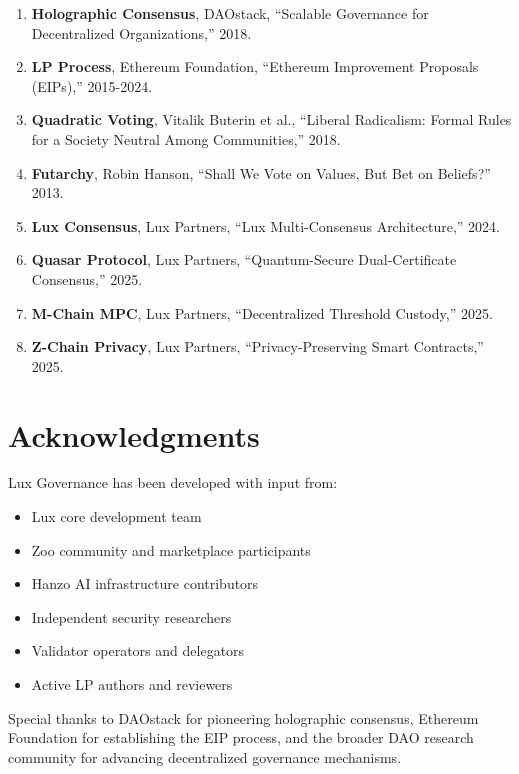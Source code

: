 \documentclass[11pt,a4paper]{article}
\begin{document}
\begin{enumerate}
\item \textbf{Holographic Consensus}, DAOstack, ``Scalable Governance for Decentralized Organizations,'' 2018.

\item \textbf{LP Process}, Ethereum Foundation, ``Ethereum Improvement Proposals (EIPs),'' 2015-2024.

\item \textbf{Quadratic Voting}, Vitalik Buterin et al., ``Liberal Radicalism: Formal Rules for a Society Neutral Among Communities,'' 2018.

\item \textbf{Futarchy}, Robin Hanson, ``Shall We Vote on Values, But Bet on Beliefs?'' 2013.

\item \textbf{Lux Consensus}, Lux Partners, ``Lux Multi-Consensus Architecture,'' 2024.

\item \textbf{Quasar Protocol}, Lux Partners, ``Quantum-Secure Dual-Certificate Consensus,'' 2025.

\item \textbf{M-Chain MPC}, Lux Partners, ``Decentralized Threshold Custody,'' 2025.

\item \textbf{Z-Chain Privacy}, Lux Partners, ``Privacy-Preserving Smart Contracts,'' 2025.
\end{enumerate}

\section*{Acknowledgments}

Lux Governance has been developed with input from:
\begin{itemize}
\item Lux core development team
\item Zoo community and marketplace participants
\item Hanzo AI infrastructure contributors
\item Independent security researchers
\item Validator operators and delegators
\item Active LP authors and reviewers
\end{itemize}

Special thanks to DAOstack for pioneering holographic consensus, Ethereum Foundation for establishing the EIP process, and the broader DAO research community for advancing decentralized governance mechanisms.
\end{document}
